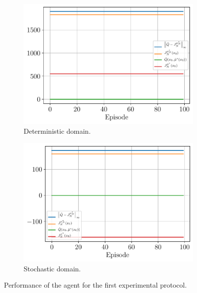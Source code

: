 \documentclass[a4paper, 12pt]{article}
\begin{document}
    \begin{figure}[h]
        \begin{subfigure}[b]{0.47\textwidth}
            \centering
            \includegraphics[width=\textwidth]{resources/pdf/5.2.2_deterministic.pdf}
            \caption{Deterministic domain.}
        \end{subfigure}
        \hfill
        \begin{subfigure}[b]{0.47\textwidth}
            \centering
            \includegraphics[width=\textwidth]{resources/pdf/5.2.2_stochastic.pdf}
            \caption{Stochastic domain.}
        \end{subfigure}
        \caption{Performance of the agent for the first experimental protocol.}
        \label{fig:ql.second.protocol}
    \end{figure}
    
\end{document}
